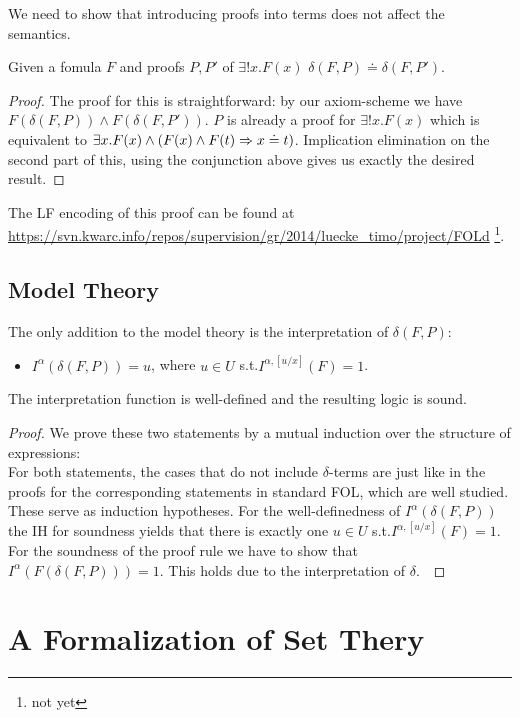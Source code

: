 \documentclass{article}
\begin{document}
We need to show that introducing proofs into terms does not affect the semantics.
\begin{theorem}
Given a fomula $F$ and proofs $P,P'$ of $\exists!x.F(x)$ $\delta(F,P)\doteq \delta(F,P')$.
\end{theorem}
\begin{proof}
The proof for this is straightforward: by our axiom-scheme we have $F(\delta(F,P))\wedge F(\delta(F,P'))$. $P$ is already a proof for $\exists!x.F(x)$ which is equivalent to $\exists x.F(x)\wedge (F(x)\wedge F(t)\Rightarrow x\doteq t)$. Implication elimination on the second part of this, using the conjunction above gives us exactly the desired result.
\end{proof}
The LF encoding of this proof can be found at \url{https://svn.kwarc.info/repos/supervision/gr/2014/luecke_timo/project/FOLd} \footnote{not yet}. %

\subsection{Model Theory}

The only addition to the model theory is the interpretation of $\delta(F,P)$:\\
\begin{itemize}
\item $I^\alpha(\delta(F,P)) = u$, where $u\in U$ s.t.$I^{\alpha,[u/x]}(F)=1$.
\end{itemize}

\begin{theorem}
The interpretation function is well-defined and the resulting logic is sound.
\end{theorem}

\begin{proof}
We prove these two statements by a mutual induction over the structure of expressions: \\
For both statements, the cases that do not include $\delta$-terms are just like in the proofs for the corresponding statements in standard FOL, which are well studied. These serve as induction hypotheses.
For the well-definedness of  $I^\alpha(\delta(F,P))$ the IH for soundness yields that there is exactly one $u\in U$ s.t.$I^{\alpha,[u/x]}(F)=1$.
For the soundness of the proof rule we have to show that $I^\alpha(F(\delta(F,P)))=1$. This holds due to the interpretation of $\delta$.\
\end{proof}

\section{A Formalization of Set Thery}
\end{document}
